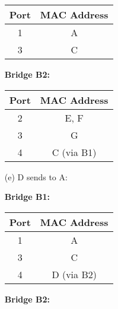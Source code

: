 \documentclass[11pt]{article}
\begin{document}
\begin{itemize}
\begin{table}[ht]
\begin{minipage}{.35\textwidth}
                \begin{tabular}{|c|c|}
                    \hline
                    Port & MAC Address \\
                    \hline
                    1    & A           \\
                    3    & C           \\
                    \hline
                \end{tabular}
            \end{minipage}
            \begin{minipage}{.35\textwidth}
                \centering
                \textbf{Bridge B2:}

                \begin{tabular}{|c|c|}
                    \hline
                    Port & MAC Address \\
                    \hline
                    2    & E, F        \\
                    3    & G           \\
                    4    & C (via B1)  \\
                    \hline
                \end{tabular}
            \end{minipage}\label{tab:table-d}
        \end{table}




        \item[(e)] D sends to A:
            \begin{table}[ht]
            \centering
            \begin{minipage}{.4\textwidth}
                \centering
                \textbf{Bridge B1:}

                \begin{tabular}{|c|c|}
                    \hline
                    Port & MAC Address \\
                    \hline
                    1    & A           \\
                    3    & C           \\
                    4    & D (via B2)  \\
                    \hline
                \end{tabular}
            \end{minipage}
            \begin{minipage}{.4\textwidth}
                \centering
                \textbf{Bridge B2:}


\end{minipage}
\end{table}
\end{itemize}
\end{document}
